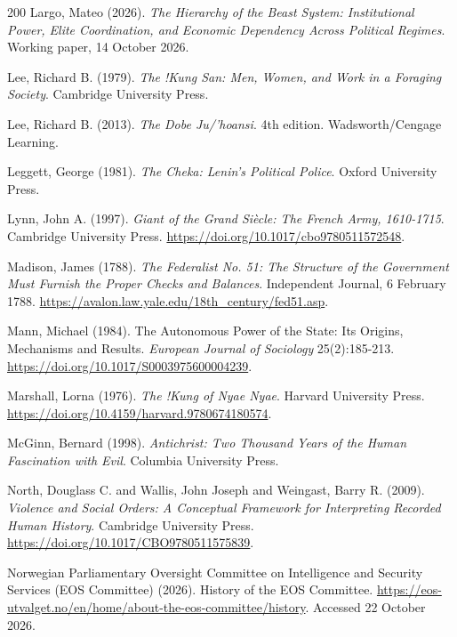 \documentclass[11pt,letterpaper]{article}
\theoremstyle{definition}
\theoremstyle{remark}
\begin{document}
\begin{thebibliography}{200}
Largo, Mateo (2026). \emph{The Hierarchy of the Beast System: Institutional Power, Elite Coordination, and Economic Dependency Across Political Regimes}. Working paper, 14 October 2026.

Lee, Richard B. (1979). \emph{The !Kung San: Men, Women, and Work in a Foraging Society}. Cambridge University Press.

Lee, Richard B. (2013). \emph{The Dobe Ju/'hoansi}. 4th edition. Wadsworth/Cengage Learning.

Leggett, George (1981). \emph{The Cheka: Lenin's Political Police}. Oxford University Press.

Lynn, John A. (1997). \emph{Giant of the Grand Si\`ecle: The French Army, 1610-1715}. Cambridge University Press. \url{https://doi.org/10.1017/cbo9780511572548}.

Madison, James (1788). \emph{The Federalist No. 51: The Structure of the Government Must Furnish the Proper Checks and Balances}. Independent Journal, 6 February 1788. \url{https://avalon.law.yale.edu/18th_century/fed51.asp}.

Mann, Michael (1984). The Autonomous Power of the State: Its Origins, Mechanisms and Results. \emph{European Journal of Sociology} 25(2):185-213. \url{https://doi.org/10.1017/S0003975600004239}.

Marshall, Lorna (1976). \emph{The !Kung of Nyae Nyae}. Harvard University Press. \url{https://doi.org/10.4159/harvard.9780674180574}.

McGinn, Bernard (1998). \emph{Antichrist: Two Thousand Years of the Human Fascination with Evil}. Columbia University Press.

North, Douglass C. and Wallis, John Joseph and Weingast, Barry R. (2009). \emph{Violence and Social Orders: A Conceptual Framework for Interpreting Recorded Human History}. Cambridge University Press. \url{https://doi.org/10.1017/CBO9780511575839}.

 Norwegian Parliamentary Oversight Committee on Intelligence and Security Services (EOS Committee) (2026). History of the EOS Committee. \url{https://eos-utvalget.no/en/home/about-the-eos-committee/history}. Accessed 22 October 2026.


\end{thebibliography}
\end{document}
